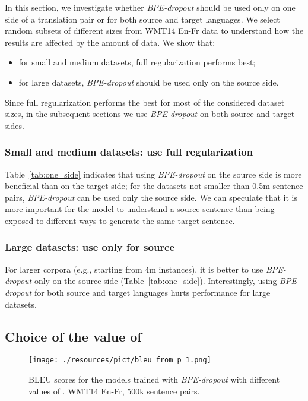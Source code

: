 \documentclass[11pt,a4paper]{article}
\begin{document}
In this section, we investigate whether \textit{BPE-dropout} should be used only on one side of a translation pair or for both source and target languages. We select random subsets of different sizes from WMT14 En-Fr data to understand how the results are affected by the amount of data. We show that:
\begin{itemize}
    \item for small and medium datasets, full regularization performs best;
    \item for large datasets, \textit{BPE-dropout} should be used only on the source side.
\end{itemize}

Since full regularization performs the best for most of the considered dataset sizes, in the subsequent sections we use \textit{BPE-dropout} on both source and target sides.


\subsubsection{Small and medium datasets: use full regularization}

Table~\ref{tab:one_side} indicates that using \textit{BPE-dropout} on the source side is more beneficial than on the target side; for the datasets not smaller than 0.5m sentence pairs, \textit{BPE-dropout} can be used only the source side. We can speculate that it is more important for the model to understand a source sentence than being exposed to different ways to generate the same target sentence.


\subsubsection{Large datasets: use only for source}

For larger corpora (e.g., starting from 4m instances),  it is better to use \textit{BPE-dropout} only on the source side (Table~\ref{tab:one_side}). Interestingly, using \textit{BPE-dropout} for both source and target languages hurts performance for large datasets.





\subsection{Choice of the value of }
\label{sect:choice_of_p}

\begin{figure}[t!]
    \centering
    \texttt{[image: ./resources/pict/bleu\_from\_p\_1.png]}
    \caption{BLEU scores for the models trained with \textit{BPE-dropout} with different values of . WMT14 En-Fr, 500k sentence pairs.}
    \label{fig:drop_grid}
\end{figure}
\end{document}
